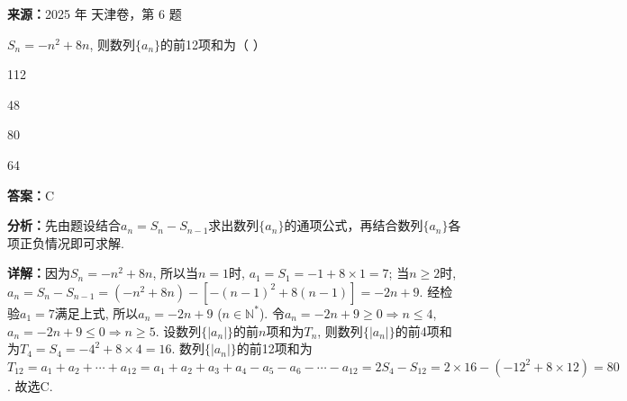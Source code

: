 \begin{question}[points=5]
\textbf{来源：}2025 年 天津卷，第 6 题\par
$S_n = -n^2 + 8n$, 则数列$\{a_n\}$的前12项和为（   ）
\begin{choices}
  \item 112
  \item 48
  \item 80
  \item 64
\end{choices}
\begin{solution}
\textbf{答案：}C

\textbf{分析：}先由题设结合$a_n = S_n - S_{n-1}$求出数列$\{a_n\}$的通项公式，再结合数列$\{a_n\}$各项正负情况即可求解.

\textbf{详解：}因为$S_n = -n^2 + 8n$, 所以当$n=1$时, $a_1 = S_1 = -1 + 8 \times 1 = 7$; 当$n \ge 2$时, $a_n = S_n - S_{n-1} = (-n^2 + 8n) - [-(n-1)^2 + 8(n-1)] = -2n + 9$. 经检验$a_1 = 7$满足上式, 所以$a_n = -2n + 9$ ($n \in \mathbb{N}^*$). 令$a_n = -2n + 9 \ge 0 \Rightarrow n \le 4$, $a_n = -2n + 9 \le 0 \Rightarrow n \ge 5$. 设数列$\{|a_n|\}$的前$n$项和为$T_n$, 则数列$\{|a_n|\}$的前4项和为$T_4 = S_4 = -4^2 + 8 \times 4 = 16$. 数列$\{|a_n|\}$的前12项和为$T_{12} = a_1 + a_2 + \cdots + a_{12} = a_1 + a_2 + a_3 + a_4 - a_5 - a_6 - \cdots - a_{12} = 2S_4 - S_{12} = 2 \times 16 - (-12^2 + 8 \times 12) = 80$. 故选C.
\end{solution}
\end{question}

